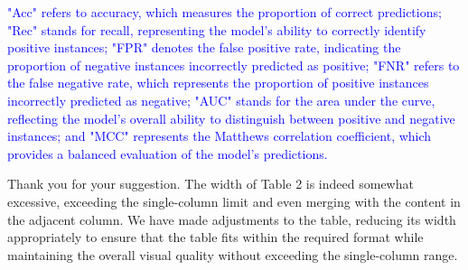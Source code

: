 \documentclass[a4paper,twoside,11pt,dvipsnames]{reviewresponse}
\begin{document}
\textcolor{blue}{
"Acc" refers to accuracy, which measures the proportion of correct predictions; "Rec" stands for recall, representing the model's ability to correctly identify positive instances; "FPR" denotes the false positive rate, indicating the proportion of negative instances incorrectly predicted as positive; "FNR" refers to the false negative rate, which represents the proportion of positive instances incorrectly predicted as negative; "AUC" stands for the area under the curve, reflecting the model's overall ability to distinguish between positive and negative instances; and "MCC" represents the Matthews correlation coefficient, which provides a balanced evaluation of the model's predictions.
}



Thank you for your suggestion. The width of Table 2 is indeed somewhat excessive, exceeding the single-column limit and even merging with the content in the adjacent column. We have made adjustments to the table, reducing its width appropriately to ensure that the table fits within the required format while maintaining the overall visual quality without exceeding the single-column range.
\end{document}
